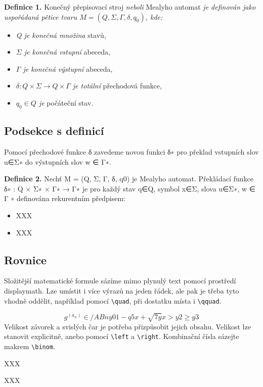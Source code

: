 \documentclass[a4paper, twocolumn, 11pt]{article}
\begin{document}
\noindent\textbf{Definice 1.} Konečný přepisovací stroj \emph{neboli} Mealyho automat \emph{je definován jako uspořádaná pětice tvaru $M = (Q, \Sigma, \Gamma, \delta, q_0)$, kde:}

\begin{itemize}
    \item \emph{Q je konečná množina} stavů,
    \item \emph{$\Sigma$ je konečná vstupní} abeceda,
    \item \emph{$\Gamma$ je konečná výstupní} abeceda,
    \item \emph{$\delta : Q × \Sigma → Q × \Gamma$ je totální} přechodová funkce,
    \item \emph{${q_0 ∈ Q}$ je} počáteční stav.
\end{itemize}

\subsection{Podsekce s definicí}

Pomocí přechodové funkce δ zavedeme novou funkci δ∗ pro překlad vstupních slov u∈Σ∗ do výstupních slov w ∈ Γ∗.

\noindent\textbf{Definice 2.} Nechť M = (Q, Σ, Γ, δ, q0) je Mealyho automat. Překládací funkce δ∗ : Q × Σ∗ × Γ∗ → Γ∗ je pro každý stav q∈Q, symbol x∈Σ, slova u∈Σ∗, w ∈ Γ ∗ definována rekurentním předpisem:

\begin{itemize}
    \item XXX
    \item XXX
\end{itemize}

\subsection{Rovnice}

Složitější matematické formule sázíme mimo plynulý text pomocí prostředí displaymath. Lze umístit i více výrazů na jeden řádek, ale pak je třeba tyto vhodně oddělit, například pomocí \verb|\quad|, při dostatku místa i \verb|\qquad|.

$$g^(a_n) ∈/ A B n y 01 − q5 x + \sqrt{7y} x > y 2 ≥ y 3$$
Velikost závorek a svislých čar je potřeba přizpůsobit jejich obsahu. Velikost lze stanovit explicitně, anebo pomocí \verb|\left| a \verb|\right|. Kombinační čísla sázejte makrem \verb|\binom|.

XXX

XXX
\end{document}
